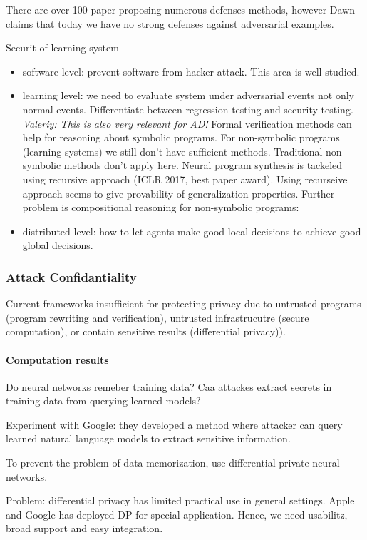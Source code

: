 \documentclass[11pt,oneside,a4paper]{scrartcl}
\newcommand{\valeriy}[1]{{\color{blue}\textit{Valeriy: #1}}}
\begin{document}
There are over 100 paper proposing numerous defenses methods, however
Dawn claims that today we have no strong defenses against adversarial
examples.

Securit of learning system
\begin{itemize}
\item software level: prevent software from hacker attack. This area
  is well studied.
\item learning level: we need to evaluate system under adversarial
  events not only normal events. Differentiate between regression
  testing and security testing. \valeriy{This is also very relevant
    for AD!} Formal verification methods can help for reasoning about
  symbolic programs. For non-symbolic programs (learning systems) we
  still don't have sufficient methods. Traditional non-symbolic
  methods don't apply here. Neural program synthesis is tackeled using
  recursive approach (ICLR 2017, best paper award). Using recurseive
  approach seems to give provability of generalization
  properties. Further problem is compositional reasoning for
  non-symbolic programs: 
\item distributed level: how to let agents make good local decisions to achieve good
  global decisions.
\end{itemize}

\subsubsection{Attack Confidantiality}
\label{sec:confidantiality}

Current frameworks insufficient for protecting privacy due to untrusted
programs (program rewriting and verification), untrusted
infrastrucutre (secure computation), or contain sensitive results
(differential privacy)).

\paragraph{Computation results}

Do neural networks remeber training data? Caa attackes extract secrets
in training data from querying learned models?

Experiment with Google: they developed a method where attacker can
query learned natural language models to extract sensitive information.

To prevent the problem of data memorization, use differential private
neural networks. 

Problem: differential privacy has limited practical use in general
settings. Apple and Google has deployed DP for special
application. Hence, we need usabilitz, broad support and easy
integration.
\end{document}
